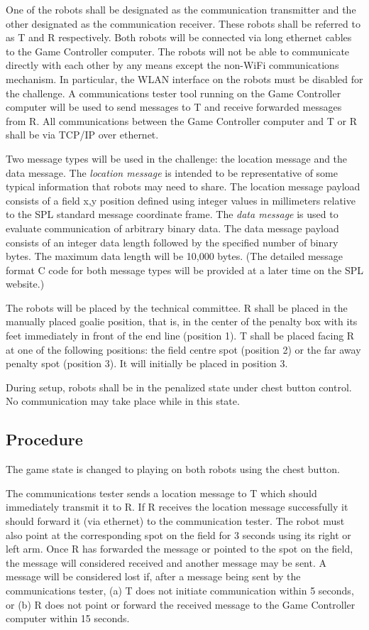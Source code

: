 \documentclass[12pt]{article}
\begin{document}
One of the robots shall be designated as
the communication transmitter and the other designated as the communication receiver. 
These robots shall be referred to as T and R respectively.
Both robots will be connected via long ethernet cables to the Game Controller computer.
The robots will not be able to communicate directly with each other by any means except the non-WiFi communications mechanism. In particular, the WLAN interface on the robots must be disabled for the challenge.
A communications tester tool running on the Game Controller computer will be used to send messages to T and receive forwarded messages from R. 
All communications between the Game Controller computer and T or R shall be via TCP/IP over ethernet.

Two message types will be used in the challenge: the location message and the data message. The {\em location message} is intended to be representative of some typical information that robots may need to share. The location message  payload consists of a field x,y position defined using integer values in millimeters relative to the SPL standard message coordinate frame.
The {\em data message} is used to evaluate communication of arbitrary binary data. The data message payload consists of an integer data length followed by the specified number of binary bytes. The maximum data length will be 10,000 bytes. (The detailed message format C code for both message types will be provided at a later time on the SPL website.)

The robots will be placed by the technical committee. 
R shall be placed in the manually placed goalie
position, that is, in the center of the penalty box with its feet immediately in front of the end line (position 1).
T shall be placed facing R at one of the following positions: the field centre spot (position 2) or the far away penalty spot (position 3). It will initially be placed in position 3.

During setup, robots shall be in the penalized state under chest button control. No communication may take place while in this state.

\subsection{Procedure}
The game state is changed to playing on both robots using the chest button.

The communications tester sends a location message to T which should immediately transmit it to R.
If R receives the location message successfully it should forward it (via ethernet) to the communication tester. The robot must also point at the corresponding spot on the field for 3 seconds using its right or left arm. Once R has forwarded the message or pointed to the spot on the field, the message will considered received and another message may be sent. A message will be considered lost if, after a message being sent by the communications tester, (a) T does not initiate communication within 5 seconds, or (b) R does not point or forward the received message to the Game Controller computer within 15 seconds.
\end{document}
